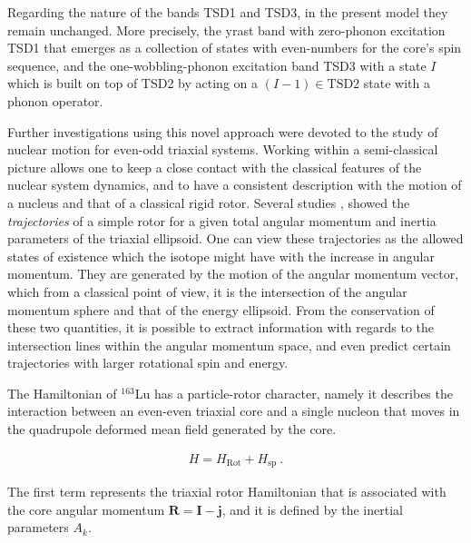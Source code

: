 \documentclass[%
 reprint,
 amsmath,
 amssymb,
 aps,
 floatfix,
]{revtex4-2}
\begin{document}
Regarding the nature of the bands TSD1 and TSD3, in the present model they remain unchanged. More precisely, the yrast band with zero-phonon excitation TSD1 that emerges as a collection of states with even-numbers for the core's spin sequence, and the one-wobbling-phonon excitation band TSD3 with a state $I$ which is built on top of TSD2 by acting on a $(I-1)\in \text{TSD2}$ state with a phonon operator.

Further investigations using this novel approach were devoted to the study of nuclear motion for even-odd triaxial systems. Working within a semi-classical picture allows one to keep a close contact with the classical features of the nuclear system dynamics, and to have a consistent description with the motion of a nucleus and that of a classical rigid rotor. Several studies \cite{frauendorf2014transverse}, \cite{lawrie2020tilted} showed the \emph{trajectories} of a simple rotor for a given total angular momentum and inertia parameters of the triaxial ellipsoid. One can view these trajectories as the allowed states of existence which the isotope might have with the increase in angular momentum. They are generated by the motion of the angular momentum vector, which from a classical point of view, it is the intersection of the angular momentum sphere and that of the energy ellipsoid. From the conservation of these two quantities, it is possible to extract information with regards to the intersection lines within the angular momentum space, and even predict certain trajectories with larger rotational spin and energy.
 



The Hamiltonian of $^{163}$Lu has a particle-rotor character, namely it describes the interaction between an even-even triaxial core and a single nucleon that moves in the quadrupole deformed mean field generated by the core.

\begin{align}
    H=H_\text{Rot}+H_\text{sp}\ . \label{hamiltonian_formula}
\end{align}

The first term represents the triaxial rotor Hamiltonian that is associated with the core angular momentum $\mathbf{R}=\mathbf{I}-\mathbf{j}$, and it is defined by the inertial parameters $A_k$.
\end{document}
